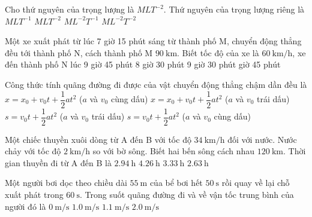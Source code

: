 \begin{ex}
	Cho thứ nguyên của trọng lượng là $MLT^{-2}$. Thứ nguyên của trọng lượng riêng là
	\choice
	{$MLT^{-1}$}
	{$MLT^{-2}$}
	{$ML^{-2}T^{-1}$}
	{\True $ML^{-2}T^{-2}$}
\end{ex}
\begin{ex}
	Một xe xuất phát từ lúc 7 giờ 15 phút sáng từ thành phố M, chuyển động thẳng đều tới thành phố N, cách thành phố M $\SI{90}{\kilo\meter}$. Biết tốc độ của xe là $\SI{60}{\kilo\meter/\hour}$, xe đến thành phố N lúc	
	\choice
	{9 giờ 45 phút}
	{8 giờ 30 phút}
	{9 giờ 30 phút}
	{ giờ 45 phút}
\end{ex}
\begin{ex}
	Công thức tính quãng đường đi được của vật chuyển động thẳng chậm dần đều là
	\choice
	{$x=x_0+v_0t+\dfrac{1}{2}at^2$ ($a$ và $v_0$ cùng dấu)}
	{$x=x_0+v_0t+\dfrac{1}{2}at^2$ ($a$ và $v_0$ trái dấu)}
	{\True $s=v_0t+\dfrac{1}{2}at^2$ ($a$ và $v_0$ trái dấu)}
	{$s=v_0t+\dfrac{1}{2}at^2$ ($a$ và $v_0$ cùng dấu)}
	\loigiai{
		
	}
\end{ex}
\begin{ex}
	Một chiếc thuyền xuôi dòng từ A đến B với tốc độ $\SI{34}{\kilo\meter/\hour}$ đối với nước. Nước chảy với tốc độ $\SI{2}{\kilo\meter/\hour}$ so với bờ sông. Biết hai bến sông cách nhau $\SI{120}{\kilo\meter}$. Thời gian thuyền đi từ A đến B là
	\choice
	{$\SI{2.94}{\hour}$}
	{$\SI{4.26}{\hour}$}
	{\True $\SI{3.33}{\hour}$}
	{$\SI{2.63}{\hour}$}
\end{ex}
\begin{ex}
	Một người bơi dọc theo chiều dài $\SI{55}{\meter}$ của bể bơi hết $\SI{50}{\second}$ rồi quay về lại chỗ xuất phát trong $\SI{60}{\second}$. Trong suốt quãng đường đi và về vận tốc trung bình của người đó là
	\choice
	{\True $\SI{0}{\meter/\second}$}
	{$\SI{1.0}{\meter/\second}$}
	{$\SI{1.1}{\meter/\second}$}
	{$\SI{2.0}{\meter/\second}$}
\end{ex}

